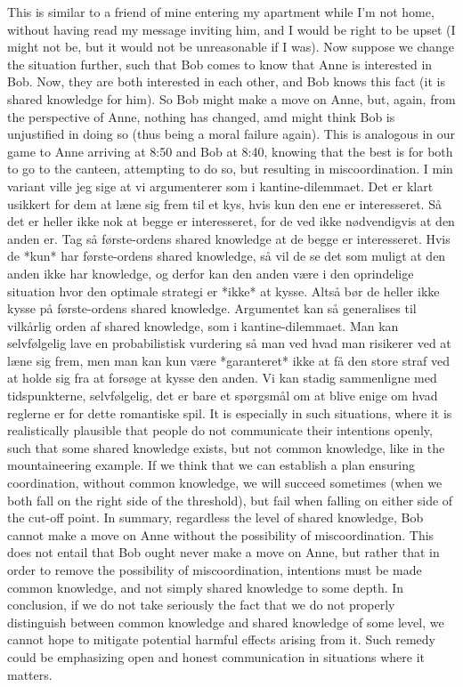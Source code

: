 \documentclass[a4paper]{article}
\newenvironment{tsn}{\smallskip \noindent \color{purple}}{\color{black}\smallskip}
\newenvironment{tobo}{\smallskip \noindent \color{yellow!80!black!80}}{\color{black}\smallskip}
\begin{document}
\begin{tsn}
 This is similar to a friend of mine entering my apartment while I'm not home, without having read my message inviting him, and I would be right to be upset (I might not be, but it would not be unreasonable if  I was). Now suppose we change the situation further, such that Bob comes to know that Anne is interested in Bob. Now, they are both interested in each other, and Bob knows this fact (it is shared knowledge for him). So Bob might make a move on Anne, but, again, from the perspective of Anne, nothing has changed, amd might think Bob is unjustified in doing so (thus being a moral failure again). This is analogous in our game to Anne arriving at 8:50 and Bob at 8:40, knowing that the best is for both to go to the canteen, attempting to do so, but resulting in miscoordination.
\begin{tobo}
I min variant ville jeg sige at vi argumenterer som i kantine-dilemmaet. Det er klart usikkert for dem at læne sig frem til et kys, hvis kun den ene er interesseret. Så det er heller ikke nok at begge er interesseret, for de ved ikke nødvendigvis at den anden er. Tag så første-ordens shared knowledge at de begge er interesseret. Hvis de *kun* har første-ordens shared knowledge, så vil de se det som muligt at den anden ikke har knowledge, og derfor kan den anden være i den oprindelige situation hvor den optimale strategi er *ikke* at kysse. Altså bør de heller ikke kysse på første-ordens shared knowledge. Argumentet kan så generalises til vilkårlig orden af shared knowledge, som i kantine-dilemmaet. Man kan selvfølgelig lave en probabilistisk vurdering så man ved hvad man risikerer ved at læne sig frem, men man kan kun være *garanteret* ikke at få den store straf ved at holde sig fra at forsøge at kysse den anden. Vi kan stadig sammenligne med tidspunkterne, selvfølgelig, det er bare et spørgsmål om at blive enige om hvad reglerne er for dette romantiske spil.  
\end{tobo} 
  It is especially in such situations, where it is realistically plausible that people do not communicate their intentions openly, such that some shared knowledge exists, but not common knowledge, like in the mountaineering example. If we think that we can establish a plan ensuring coordination, without common knowledge, we will succeed sometimes (when we both fall on the right side of the threshold), but fail when falling on either side of the cut-off point. In summary, regardless the level of shared knowledge, Bob cannot make a move on Anne without the possibility of miscoordination. This does not entail that Bob ought never make a move on Anne, but rather that in order to remove the possibility of miscoordination, intentions must be made common knowledge, and not simply shared knowledge to some depth. In conclusion, if we do not take seriously the fact that we do not properly distinguish between common knowledge and shared knowledge of some level, we cannot hope to mitigate potential harmful effects arising from it. Such remedy could be emphasizing open and honest communication in situations where it matters. 


\end{tsn}
\end{document}
